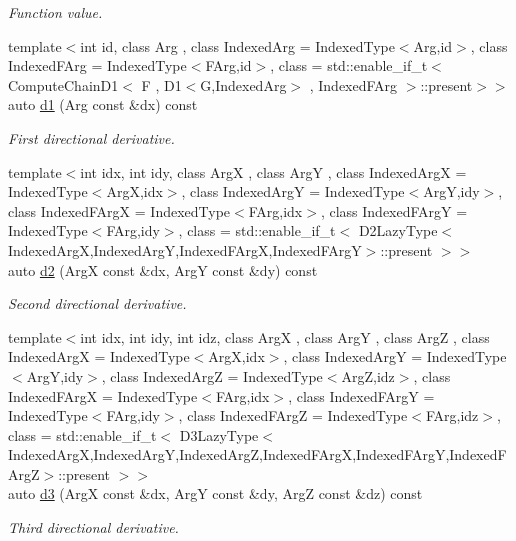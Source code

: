 \begin{DoxyCompactItemize}
\begin{DoxyCompactList}\small\item\em Function value. \end{DoxyCompactList}\item 
{\footnotesize template$<$int id, class Arg , class Indexed\-Arg  = Indexed\-Type$<$\-Arg,id$>$, class Indexed\-F\-Arg  = Indexed\-Type$<$\-F\-Arg,id$>$, class  = std\-::enable\-\_\-if\-\_\-t$<$ Compute\-Chain\-D1$<$ F , D1$<$\-G,\-Indexed\-Arg$>$ , Indexed\-F\-Arg $>$\-::present$>$$>$ }\\auto \hyperlink{structFunG_1_1MathematicalOperations_1_1Chain_adfe741dee89257258b39df846fd16cf7}{d1} (Arg const \&dx) const 
\begin{DoxyCompactList}\small\item\em First directional derivative. \end{DoxyCompactList}\item 
{\footnotesize template$<$int idx, int idy, class Arg\-X , class Arg\-Y , class Indexed\-Arg\-X  = Indexed\-Type$<$\-Arg\-X,idx$>$, class Indexed\-Arg\-Y  = Indexed\-Type$<$\-Arg\-Y,idy$>$, class Indexed\-F\-Arg\-X  = Indexed\-Type$<$\-F\-Arg,idx$>$, class Indexed\-F\-Arg\-Y  = Indexed\-Type$<$\-F\-Arg,idy$>$, class  = std\-::enable\-\_\-if\-\_\-t$<$ D2\-Lazy\-Type$<$\-Indexed\-Arg\-X,\-Indexed\-Arg\-Y,\-Indexed\-F\-Arg\-X,\-Indexed\-F\-Arg\-Y$>$\-::present $>$$>$ }\\auto \hyperlink{structFunG_1_1MathematicalOperations_1_1Chain_a0ab88c09299ce967583408f7f7dcd2bb}{d2} (Arg\-X const \&dx, Arg\-Y const \&dy) const 
\begin{DoxyCompactList}\small\item\em Second directional derivative. \end{DoxyCompactList}\item 
{\footnotesize template$<$int idx, int idy, int idz, class Arg\-X , class Arg\-Y , class Arg\-Z , class Indexed\-Arg\-X  = Indexed\-Type$<$\-Arg\-X,idx$>$, class Indexed\-Arg\-Y  = Indexed\-Type$<$\-Arg\-Y,idy$>$, class Indexed\-Arg\-Z  = Indexed\-Type$<$\-Arg\-Z,idz$>$, class Indexed\-F\-Arg\-X  = Indexed\-Type$<$\-F\-Arg,idx$>$, class Indexed\-F\-Arg\-Y  = Indexed\-Type$<$\-F\-Arg,idy$>$, class Indexed\-F\-Arg\-Z  = Indexed\-Type$<$\-F\-Arg,idz$>$, class  = std\-::enable\-\_\-if\-\_\-t$<$ D3\-Lazy\-Type$<$\-Indexed\-Arg\-X,\-Indexed\-Arg\-Y,\-Indexed\-Arg\-Z,\-Indexed\-F\-Arg\-X,\-Indexed\-F\-Arg\-Y,\-Indexed\-F\-Arg\-Z$>$\-::present $>$$>$ }\\auto \hyperlink{structFunG_1_1MathematicalOperations_1_1Chain_a17ac1618545b9d9bd2efa873b36cfbc7}{d3} (Arg\-X const \&dx, Arg\-Y const \&dy, Arg\-Z const \&dz) const 
\begin{DoxyCompactList}\small\item\em Third directional derivative. \end{DoxyCompactList}\end{DoxyCompactItemize}


